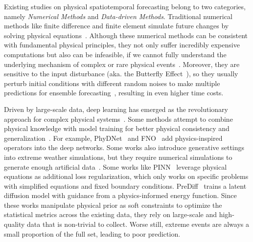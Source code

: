 Existing studies on physical spatiotemporal forecasting belong to two categories, namely \textit{Numerical Methods} and \textit{Data-driven Methods}.
Traditional numerical methods like finite difference and finite element simulate future changes by solving physical equations~\cite{jouvet2009numerical, rogallo1984numerical, orszag1974numerical}. Although these numerical methods can be consistent with fundamental physical principles, they not only suffer incredibly expensive computations but also can be infeasible, if we cannot fully understand the underlying mechanism of complex or rare physical events~\cite{takamoto2022pdebench}.
Moreover, they are sensitive to the input disturbance (aka. the Butterfly Effect~\cite{lorenz1972predictability}), so they usually perturb initial conditions with different random noises to make multiple predictions for ensemble forecasting~\cite{LEUTBECHER20083515, karlbauer2024advancing}, resulting in even higher time costs.

Driven by large-scale data, deep learning has emerged as the revolutionary approach for complex physical systems~\cite{shi2015convolutional, gao2022earthformer, tan2022simvp}.
    Some methods attempt to combine physical knowledge with model training for better physical consistency and generalization~\cite{long2018pde,greydanus2019hamiltonian,cranmer2020lagrangian}. 
    For example, PhyDNet~\cite{guen2020disentangling} and FNO~\cite{li2020fourier} add physics-inspired operators into the deep networks.
    Some works also introduce generative settings into extreme weather simulations, but they require numerical simulations to generate enough artificial data~\cite{zhang2023skilful, ravuri2021skilful}.
    Some works like PINN~\cite{raissi2019physics, li2021physics,hansen2023learning} leverage physical equations as additional loss regularization, which only works on specific problems with simplified equations and fixed boundary conditions. 
    PreDiff~\cite{gao2024prediff} trains a latent diffusion model with guidance from a physics-informed energy function. 
    Since these works manipulate physical prior as soft constraints to optimize the statistical metrics across the existing data,
    they rely on large-scale and high-quality data that is non-trivial to collect.
    Worse still, extreme events are always a small proportion of the full set, leading to poor prediction.



